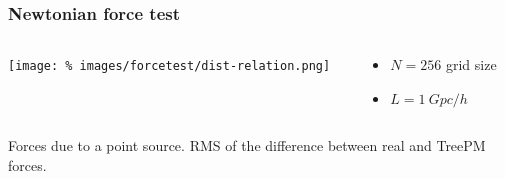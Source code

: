 \documentclass{beamer}
\makeatletter
\newcommand{\mylabel}{%
}
\makeatother
\begin{document}

\begin{frame}[label=forcetest]
    \frametitle{Newtonian force test\mylabel}
    \vspace*{-.5cm}
    \begin{columns}
        \begin{column}{.65\textwidth}
            \centering\texttt{[image: \%
                images/forcetest/dist-relation.png]} 
        \end{column}
        \begin{column}{.35\textwidth}
            \begin{itemize}
               \item $N = 256$ grid size
               \item $L = \SI{1}{Gpc}/h$
            \end{itemize}
        \end{column}
    \end{columns}
    {\small Forces due to a point source. RMS of the difference between real and
    TreePM forces.}
\end{frame}
\end{document}
